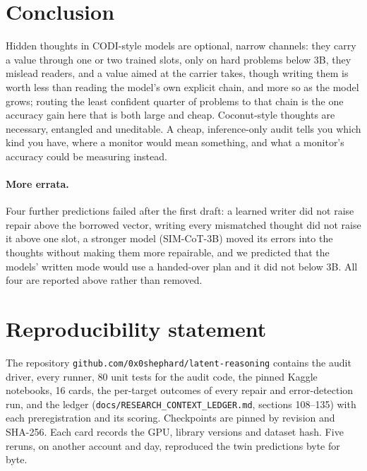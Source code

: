 \documentclass{article}
\begin{document}
\section{Conclusion}

Hidden thoughts in CODI-style models are optional, narrow channels: they carry a value through one or two trained slots, only on hard problems below 3B, they mislead readers, and a value aimed at the carrier takes, though writing them is worth less than reading the model's own explicit chain, and more so as the model grows; routing the least confident quarter of problems to that chain is the one accuracy gain here that is both large and cheap. Coconut-style thoughts are necessary, entangled and uneditable. A cheap, inference-only audit tells you which kind you have, where a monitor would mean something, and what a monitor's accuracy could be measuring instead.

\paragraph{More errata.} Four further predictions failed after the first draft: a learned writer did not raise repair above the borrowed vector, writing every mismatched thought did not raise it above one slot, a stronger model (SIM-CoT-3B) moved its errors into the thoughts without making them more repairable, and we predicted that the models' written mode would use a handed-over plan and it did not below 3B. All four are reported above rather than removed.

\section*{Reproducibility statement}

The repository \texttt{github.com/0x0shephard/latent-reasoning} contains the audit driver, every runner, 80 unit tests for the audit code, the pinned Kaggle notebooks, 16 cards, the per-target outcomes of every repair and error-detection run, and the ledger (\texttt{docs/RESEARCH\_CONTEXT\_LEDGER.md}, sections 108--135) with each preregistration and its scoring. Checkpoints are pinned by revision and SHA-256. Each card records the GPU, library versions and dataset hash. Five reruns, on another account and day, reproduced the twin predictions byte for byte.
\end{document}
